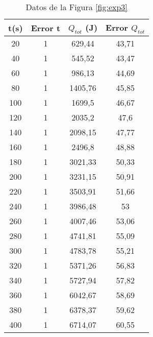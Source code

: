 \documentclass[a4paper,12pt,spanish]{article}
\begin{document}
\begin{table}[H]
	\centering
	\begin{tabular}{|c|c|c|c|}
		\hline
		t(s) & Error t & $Q_{tot}$ (J)     & Error $Q_{tot}$ \\ \hline\hline
		20   & 1       & 629,44 & 43,71           \\ \hline
		40   & 1       & 545,52            & 43,47           \\ \hline
		60   & 1       & 986,13            & 44,69           \\ \hline
		80   & 1       & 1405,76           & 45,85           \\ \hline
		100  & 1       & 1699,5            & 46,67           \\ \hline
		120  & 1       & 2035,2            & 47,6            \\ \hline
		140  & 1       & 2098,15           & 47,77           \\ \hline
		160  & 1       & 2496,8            & 48,88           \\ \hline
		180  & 1       & 3021,33           & 50,33           \\ \hline
		200  & 1       & 3231,15           & 50,91           \\ \hline
		220  & 1       & 3503,91           & 51,66           \\ \hline
		240  & 1       & 3986,48           & 53              \\ \hline
		260  & 1       & 4007,46           & 53,06           \\ \hline
		280  & 1       & 4741,81           & 55,09           \\ \hline
		300  & 1       & 4783,78           & 55,21           \\ \hline
		320  & 1       & 5371,26           & 56,83           \\ \hline
		340  & 1       & 5727,94           & 57,82           \\ \hline
		360  & 1       & 6042,67           & 58,69           \\ \hline
		380  & 1       & 6378,37           & 59,62           \\ \hline
		400  & 1       & 6714,07           & 60,55           \\ \hline
	\end{tabular}
	\caption{Datos de la Figura \ref{fig:exp3}}
	\label{tab:tab3}
\end{table}
\end{document}
